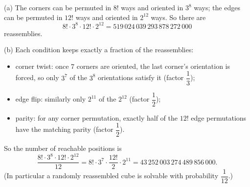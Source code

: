 (a) The corners can be permuted in $8!$ ways and oriented in $3^8$ ways; the edges can be permuted in $12!$ ways and oriented in $2^{12}$ ways. So there are
\[8!\cdot3^8\cdot12!\cdot2^{12}=519\,024\,039\,293\,878\,272\,000\]
reassemblies.

(b) Each condition keeps exactly a fraction of the reassemblies:
\begin{itemize}
\item corner twist: once $7$ corners are oriented, the last corner's orientation is forced, so only $3^7$ of the $3^8$ orientations satisfy it (factor $\dfrac{1}{3}$);
\item edge flip: similarly only $2^{11}$ of the $2^{12}$ (factor $\dfrac{1}{2}$);
\item parity: for any corner permutation, exactly half of the $12!$ edge permutations have the matching parity (factor $\dfrac{1}{2}$).
\end{itemize}
So the number of reachable positions is
\[\dfrac{8!\cdot3^8\cdot12!\cdot2^{12}}{12}=8!\cdot3^7\cdot\dfrac{12!}{2}\cdot2^{11}=\boxed{43\,252\,003\,274\,489\,856\,000}.\]
(In particular a randomly reassembled cube is solvable with probability $\dfrac{1}{12}$.)
